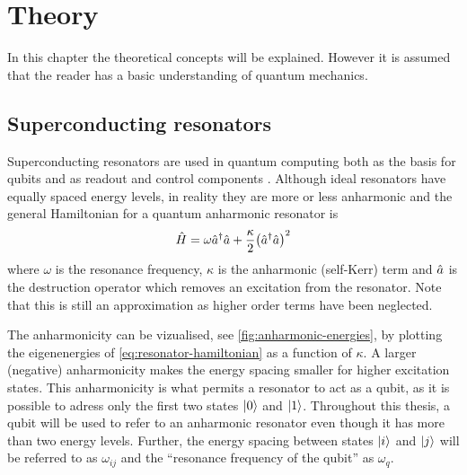 \documentclass[main.tex]{subfiles}
\begin{document}
\chapter{Theory}
In this chapter the theoretical concepts will be explained.
However it is assumed that the reader has a basic understanding of quantum mechanics.

\section{Superconducting resonators}
Superconducting resonators are used in quantum computing both as the basis for qubits and as readout and control components \cite{}.
Although ideal resonators have equally spaced energy levels, in reality they are more or less anharmonic and the general Hamiltonian for a quantum anharmonic resonator is
\begin{equation}
    \hat{H} = \omega \hat{a}^\dagger\hat{a} + \frac{\kappa}{2} \qty(\hat{a}^\dagger\hat{a})^2
    \label{eq:resonator-hamiltonian}
\end{equation}
where \( \omega \) is the resonance frequency, \( \kappa \) is the anharmonic (self-Kerr) term and \(\hat{a}\) is the destruction operator which removes an excitation from the resonator.
Note that this is still an approximation as higher order terms have been neglected.

The anharmonicity can be vizualised, see \cref{fig:anharmonic-energies}, by plotting the eigenenergies of \cref{eq:resonator-hamiltonian} as a function of \( \kappa \).
A larger (negative) anharmonicity makes the energy spacing smaller for higher excitation states.
This anharmonicity is what permits a resonator to act as a qubit, as it is possible to adress only the first two states \( \ket{0} \) and \( \ket{1} \).
Throughout this thesis, a qubit will be used to refer to an anharmonic resonator even though it has more than two energy levels.
Further, the energy spacing between states \( \ket{i} \) and \( \ket{j} \) will be referred to as \( \omega_{ij} \) and the ``resonance frequency of the qubit'' as \( \omega_q \).

\end{document}
